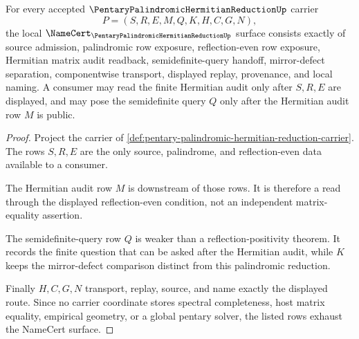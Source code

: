 \begin{theorem}
\label{thm:pentary-palindromic-hermitian-reduction-obligation-surface}
For every accepted $\PentaryPalindromicHermitianReductionUp$ carrier
$$
P=(S,R,E,M,Q,K,H,C,G,N),
$$
the local $\NameCert_{\PentaryPalindromicHermitianReductionUp}$ surface consists exactly of source admission, palindromic row exposure, reflection-even row exposure, Hermitian matrix audit readback, semidefinite-query handoff, mirror-defect separation, componentwise transport, displayed replay, provenance, and local naming. A consumer may read the finite Hermitian audit only after $S,R,E$ are displayed, and may pose the semidefinite query $Q$ only after the Hermitian audit row $M$ is public.
\end{theorem}
\begin{proof}
Project the carrier of \autoref{def:pentary-palindromic-hermitian-reduction-carrier}. The rows $S,R,E$ are the only source, palindrome, and reflection-even data available to a consumer.

The Hermitian audit row $M$ is downstream of those rows. It is therefore a read through the displayed reflection-even condition, not an independent matrix-equality assertion.

The semidefinite-query row $Q$ is weaker than a reflection-positivity theorem. It records the finite question that can be asked after the Hermitian audit, while $K$ keeps the mirror-defect comparison distinct from this palindromic reduction.

Finally $H,C,G,N$ transport, replay, source, and name exactly the displayed route. Since no carrier coordinate stores spectral completeness, host matrix equality, empirical geometry, or a global pentary solver, the listed rows exhaust the NameCert surface.
\end{proof}



